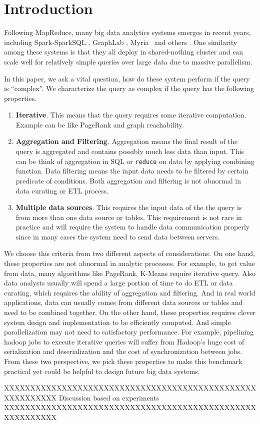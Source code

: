 \section{Introduction}

Following MapReduce, many big data analytics systems emerges in recent years, 
including Spark-SparkSQL \cite{XinRZFSS13SIGMOD, ZahariaCDDMMFSS12NSDI}, 
GraphLab \cite{GonzalezLGBG12OSDI}, Myria~\cite{HalperinACCKMORWWXBHS14SIGMOD} 
and others \cite{AbouzeidBARS09PVLDB,ThusooSJSCZALM10ICDE}. One similarity 
among these systems is that they all deploy in shared-nothing cluster and can 
scale well for relatively simple queries over large data due to massive 
parallelism. 

In this paper, we ask a vital question, how do these system perform if the
query is ``complex''. We characterize the query as complex if the query has 
the following properties.

\begin{enumerate}

\item \textbf{Iterative}. This means that the query requires some
iterative computation. Example can be like PageRank and graph reachability. 

\item \textbf{Aggregation and Filtering}. Aggregation means the final
result of the query is aggregated and contains possibly much less data
than input. This can be think of aggregation in SQL or \texttt{reduce} on data
by applying combining function. Data filtering means the input data needs to be
filtered by certain predicate of conditions. Both aggregation and filtering is 
not abnormal in data curating or ETL process.

\item \textbf{Multiple data sources}. This requires the input data of the 
the query is from more than one data source or tables. This requirement is not
rare in practice and will require the system to handle data communication
properly since in many cases the system need to send data between servers.

\end{enumerate}

We choose this criteria from two different aspects of considerations. On one
 hand, these properties are not abnormal in analytic processes.
  For example, to 
get value from data, many algorithms like PageRank, K-Means require iterative
query. Also data analysts usually will spend a large portion of time to do ETL
or data curating, which requires the ability of aggregation and filtering. And 
in real world applications, data can usually comes from different data 
sources or tables and need to be combined together. On the other hand, these
properties requires clever system design and implementation to be efficiently
computed. And simple parallelization may not need to satisfactory 
performance. For example, pipelining hadoop jobs to execute iterative 
queries will suffer from Hadoop's huge cost of serialization and 
deserialization and the cost of synchronization between jobs. From these two 
perspective, we pick these properties to make this benchmark practical yet 
could be helpful to design future big data systems. 

XXXXXXXXXXXXXXXXXXXXXXXXXXXXXXXXXXXXXXXXXXXXXXXXXXXXXXXXXX
Discussion based on experiments
XXXXXXXXXXXXXXXXXXXXXXXXXXXXXXXXXXXXXXXXXXXXXXXXXXXXXXXXXX

